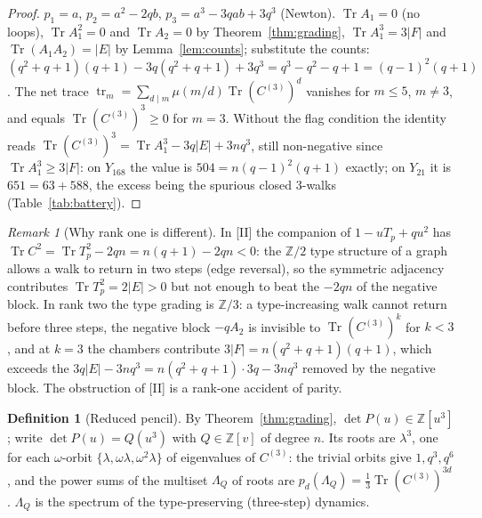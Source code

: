 \documentclass[11pt]{amsart}
\numberwithin{equation}{section}
\theoremstyle{definition}
\newtheorem{definition}[theorem]{Definition}
\theoremstyle{remark}
\newtheorem{remark}[theorem]{Remark}
\newcommand{\Z}{\mathbb{Z}}
\newcommand{\Tr}{\operatorname{Tr}}
\newcommand{\tr}{\operatorname{tr}}
\newcommand{\Cthree}{C^{(3)}}
\begin{document}
\begin{proof}
$p_1=a$, $p_2=a^{2}-2qb$, $p_3=a^{3}-3qab+3q^{3}$ (Newton). $\Tr A_1=0$ (no loops),
$\Tr A_1^{2}=0$ and $\Tr A_2=0$ by Theorem~\ref{thm:grading}, $\Tr A_1^{3}=3|F|$ and
$\Tr(A_1A_2)=|E|$ by Lemma~\ref{lem:counts}; substitute the counts:
$(q^{2}+q+1)(q+1)-3q(q^{2}+q+1)+3q^{3}=q^{3}-q^{2}-q+1=(q-1)^{2}(q+1)$. The net trace
$\tr_m=\sum_{d\mid m}\mu(m/d)\Tr(\Cthree)^{d}$ vanishes for $m\le5$, $m\neq3$, and equals
$\Tr(\Cthree)^{3}\ge0$ for $m=3$. Without the flag condition the identity reads
$\Tr(\Cthree)^{3}=\Tr A_1^{3}-3q|E|+3nq^{3}$, still non-negative since $\Tr A_1^{3}\ge3|F|$:
on $Y_{168}$ the value is $504=n(q-1)^{2}(q+1)$ exactly; on $Y_{21}$ it is $651=63+588$,
the excess being the spurious closed $3$-walks (Table~\ref{tab:battery}).
\end{proof}

\begin{remark}[Why rank one is different]\label{rem:why}
In [II] the companion of $1-uT_p+qu^{2}$ has $\Tr C^{2}=\Tr T_p^{2}-2qn=n(q+1)-2qn<0$:
the $\Z/2$ type structure of a graph allows a walk to return in two steps (edge reversal),
so the symmetric adjacency contributes $\Tr T_p^{2}=2|E|>0$ but not enough to beat the
$-2qn$ of the negative block. In rank two the type grading is $\Z/3$: a type-increasing walk
cannot return before three steps, the negative block $-qA_2$ is invisible to
$\Tr(\Cthree)^{k}$ for $k<3$, and at $k=3$ the chambers contribute $3|F|=n(q^{2}+q+1)(q+1)$,
which exceeds the $3q|E|-3nq^{3}=n(q^{2}+q+1)\cdot3q-3nq^{3}$ removed by the negative block.
The obstruction of [II] is a rank-one accident of parity.
\end{remark}

\begin{definition}[Reduced pencil]\label{def:reduced}
By Theorem~\ref{thm:grading}, $\det P(u)\in\Z[u^{3}]$; write $\det P(u)=Q(u^{3})$ with
$Q\in\Z[v]$ of degree $n$. Its roots are $\lambda^{3}$, one for each $\omega$-orbit
$\{\lambda,\omega\lambda,\omega^{2}\lambda\}$ of eigenvalues of $\Cthree$: the trivial orbits
give $1,q^{3},q^{6}$, and the power sums of the multiset $\Lambda_Q$ of roots are
$p_d(\Lambda_Q)=\tfrac13\Tr(\Cthree)^{3d}$. $\Lambda_Q$ is the spectrum of the
type-preserving (three-step) dynamics.
\end{definition}
\end{document}
